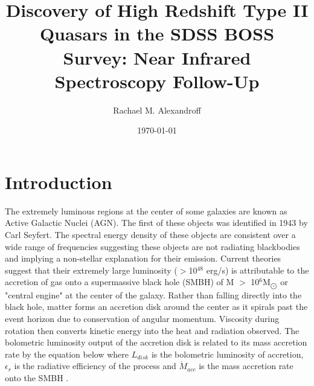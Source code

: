 \documentclass[preprint]{aastex}
\begin{document}
\title{Discovery of High Redshift Type II Quasars in the SDSS BOSS Survey: Near Infrared Spectroscopy Follow-Up}
\author{Rachael M. Alexandroff }
\date{\today}

\newpage

\begin{abstract}


\end{abstract}

\newpage

\section{Introduction}

The extremely luminous regions at the center of some galaxies are known as Active Galactic Nuclei (AGN).  The first of these objects was identified in 1943 by Carl Seyfert.  The spectral energy density  of these objects are consistent over a wide range of frequencies suggesting these objects are not radiating blackbodies and implying a non-stellar explanation for their emission.  Current theories suggest that their extremely large luminosity ($>$10$^{48}$ erg/s) is attributable to the accretion of gas onto a supermassive black hole (SMBH)  of M $>$ 10$^6$M$_{\bigodot}$ or "central engine" at the center of the galaxy.  Rather than falling directly into the black hole, matter forms an accretion disk around the center as it spirals past the event horizon due to conservation of angular momentum.  Viscosity during rotation then converts kinetic energy into the heat and radiation observed.  The bolometric luminosity output of the accretion disk is related to its mass accretion rate by the equation below where $L_{disk}$ is the bolometric luminosity of accretion, $\epsilon_r$ is the radiative efficiency of the process and $\dot{M}_{acc}$ is the mass accretion rate onto the SMBH \citep{astrobook}.
\end{document}
